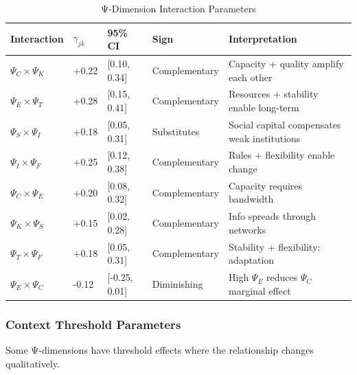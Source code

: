 \begin{table}[htbp]
\centering
\caption{Ψ-Dimension Interaction Parameters}
\label{tab:psi-gamma-interaction}
\renewcommand{\arraystretch}{1.3}
\small
\begin{tabular}{@{}llllp{5cm}@{}}
\toprule
\textbf{Interaction} & \textbf{$\gamma_{jk}$} & \textbf{95\% CI} & \textbf{Sign} & \textbf{Interpretation} \\
\midrule
$\Psi_C \times \Psi_K$ & +0.22 & [0.10, 0.34] & Complementary & Capacity + quality amplify each other \\
$\Psi_E \times \Psi_T$ & +0.28 & [0.15, 0.41] & Complementary & Resources + stability enable long-term \\
$\Psi_S \times \Psi_I$ & +0.18 & [0.05, 0.31] & Substitutes & Social capital compensates weak institutions \\
$\Psi_I \times \Psi_F$ & +0.25 & [0.12, 0.38] & Complementary & Rules + flexibility enable change \\
$\Psi_C \times \Psi_E$ & +0.20 & [0.08, 0.32] & Complementary & Capacity requires bandwidth \\
$\Psi_K \times \Psi_S$ & +0.15 & [0.02, 0.28] & Complementary & Info spreads through networks \\
$\Psi_T \times \Psi_F$ & +0.18 & [0.05, 0.31] & Complementary & Stability + flexibility: adaptation \\
$\Psi_E \times \Psi_C$ & -0.12 & [-0.25, 0.01] & Diminishing & High $\Psi_E$ reduces $\Psi_C$ marginal effect \\
\bottomrule
\end{tabular}
\end{table}

\subsubsection{Context Threshold Parameters}

Some Ψ-dimensions have threshold effects where the relationship changes qualitatively.

